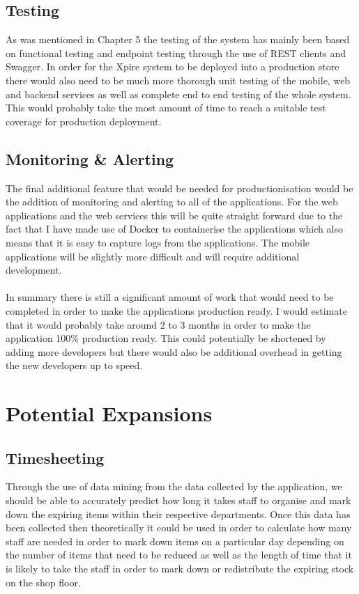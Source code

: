 \documentclass[a4paper,11pt]{report}
\begin{document}
\subsection{Testing}
As was mentioned in Chapter 5 the testing of the system has mainly been based on functional testing and endpoint testing through the use of REST clients and Swagger. In order for the Xpire system to be deployed into a production store there would also need to be much more thorough unit testing of the mobile, web and backend services as well as complete end to end testing of the whole system. This would probably take the most amount of time to reach a suitable test coverage for production deployment.

\subsection{Monitoring \& Alerting}
The final additional feature that would be needed for productionisation would be the addition of monitoring and alerting to all of the applications. For the web applications and the web services this will be quite straight forward due to the fact that I have made use of Docker to containerise the applications which also means that it is easy to capture logs from the applications. The mobile applications will be slightly more difficult and will require additional development.
\\
\\
In summary there is still a significant amount of work that would need to be completed in order to make the applications production ready. I would estimate that it would probably take around 2 to 3 months in order to make the application 100\% production ready. This could potentially be shortened by adding more developers but there would also be additional overhead in getting the new developers up to speed.


\section{Potential Expansions}

\subsection{Timesheeting}
Through the use of data mining from the data collected by the application, we should be able to accurately predict
how long it takes staff to organise and mark down the expiring items within their respective departments. Once 
this data has been collected then theoretically it could be used in order to calculate how many staff are needed 
in order to mark down items on a particular day depending on the number of items that need to be reduced as well 
as the length of time that it is likely to take the staff in order to mark down or redistribute the expiring stock
on the shop floor. 
\end{document}

